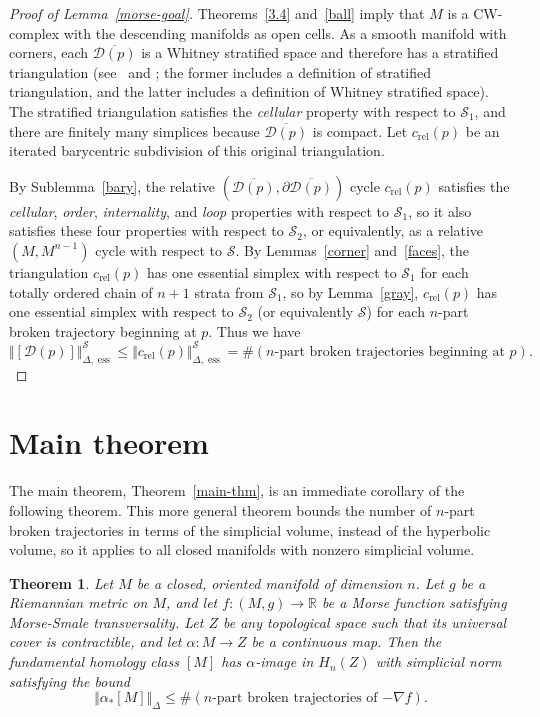 \documentclass[psamsfonts]{amsart}
\newtheorem{theorem}{Theorem}
\theoremstyle{remark}
\newcommand{\del}{\partial}
\DeclareMathOperator{\ess}{ess}
\DeclareMathOperator{\rel}{rel}
\begin{document}
\begin{proof}[Proof of Lemma~\ref{morse-goal}]
Theorems~\ref{3.4} and~\ref{ball} imply that $M$ is a CW-complex with the descending manifolds as open cells.  As a smooth manifold with corners, each $\overline{\mathcal{D}(p)}$ is a Whitney stratified space and therefore has a stratified triangulation (see~\cite{Goresky78} and \cite{Goresky88}; the former includes a definition of stratified triangulation, and the latter includes a definition of Whitney stratified space).  The stratified triangulation satisfies the \emph{cellular} property with respect to $\mathcal{S}_1$, and there are finitely many simplices because $\overline{\mathcal{D}(p)}$ is compact.  Let $c_{\rel}(p)$ be an iterated barycentric subdivision of this original triangulation.  

By Sublemma~\ref{bary}, the relative $(\overline{\mathcal{D}(p)}, \del \overline{\mathcal{D}(p)})$ cycle $c_{\rel}(p)$ satisfies the \emph{cellular}, \emph{order}, \emph{internality}, and \emph{loop} properties with respect to $\mathcal{S}_1$, so it also satisfies these four properties with respect to $\mathcal{S}_2$, or equivalently, as a relative $(M, M^{n-1})$ cycle with respect to $\mathcal{S}$.  By Lemmas~\ref{corner} and~\ref{faces}, the triangulation $c_{\rel}(p)$ has one essential simplex with respect to $\mathcal{S}_1$ for each totally ordered chain of $n+1$ strata from $\mathcal{S}_1$, so by Lemma~\ref{gray}, $c_{\rel}(p)$ has one essential simplex with respect to $\mathcal{S}_2$ (or equivalently $\mathcal{S}$) for each $n$-part broken trajectory beginning at $p$.  Thus we have
\[\Vert [\mathcal{D}(p)] \Vert_{\Delta, \ess}^\mathcal{S} \leq \Vert c_{\rel}(p) \Vert_{\Delta, \ess}^\mathcal{S} = \#(n\text{-part broken trajectories beginning at }p).\]
\end{proof}

\section{Main theorem}\label{end}

The main theorem, Theorem~\ref{main-thm}, is an immediate corollary of the following theorem.  This more general theorem bounds the number of $n$-part broken trajectories in terms of the simplicial volume, instead of the hyperbolic volume, so it applies to all closed manifolds with nonzero simplicial volume.

\begin{theorem}\label{general}
Let $M$ be a closed, oriented manifold of dimension $n$.  Let $g$ be a Riemannian metric on $M$, and let $f : (M, g) \rightarrow \mathbb{R}$ be a Morse function satisfying Morse-Smale transversality.  Let $Z$ be any topological space such that its universal cover is contractible, and let $\alpha: M \rightarrow Z$ be a continuous map.  Then the fundamental homology class $[M]$ has $\alpha$-image in $H_n(Z)$ with simplicial norm satisfying the bound
\[\Vert \alpha_*[M]\Vert_{\Delta} \leq \#(n\text{-part broken trajectories of }{-\nabla f}).\]
\end{theorem}
\end{document}
